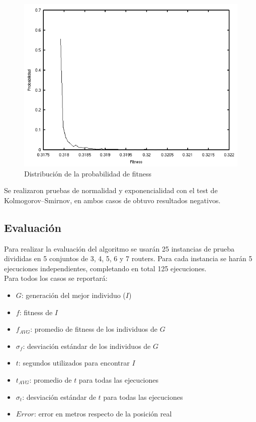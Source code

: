 \documentclass[journal]{IEEEtran}
\begin{document}
\begin{figure}[h]
\centering
\includegraphics[width=\linewidth]{density.png}
\caption{Distribución de la probabilidad de fitness}
\label{fig:density}
\end{figure}

Se realizaron pruebas de normalidad y exponencialidad con el test de Kolmogorov–Smirnov, en ambos casos de obtuvo resultados negativos.

\subsection{Evaluación}

Para realizar la evaluación del algoritmo se usarán 25 instancias de prueba divididas en 5 conjuntos de 3, 4, 5, 6 y 7 routers. Para cada instancia se harán 5 ejecuciones independientes, completando en total 125 ejecuciones.\\

Para todos los casos se reportará:\\

\begin{itemize}
\item $G$: generación del mejor individuo ($I$)
\item $f$: fitness de $I$
\item $f_{AVG}$: promedio de fitness de los individuos de $G$
\item $\sigma_f$: desviación estándar de los individuos de $G$
\item $t$: segundos utilizados para encontrar $I$
\item $t_{AVG}$: promedio de $t$ para todas las ejecuciones
\item $\sigma_t$: desviación estándar de $t$ para todas las ejecuciones
\item $Error$: error en metros respecto de la posición real
\end{itemize}
\end{document}
